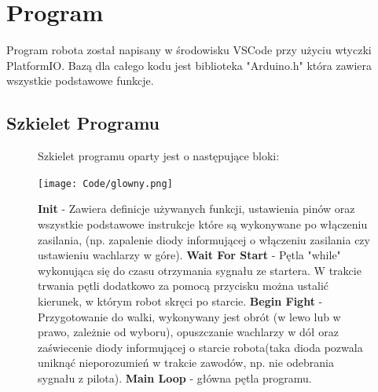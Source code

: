 \documentclass[polish,polish,a4paper]{article}
\begin{document}
    \newpage
    
\section{Program}
    Program robota został napisany w środowisku VSCode przy użyciu wtyczki PlatformIO. 
    Bazą dla całego kodu jest biblioteka "Arduino.h" która zawiera wszystkie podstawowe funkcje. 
    \subsection{Szkielet Programu}



    \begin{figure}[!htb]
       \begin{minipage}{0.3\textwidth}
         
         Szkielet programu oparty jest o następujące bloki:
    
    
        \centering
        \texttt{[image: Code/glowny.png]}
        
       \end{minipage} \hspace{5mm}
       \begin{minipage}{0.7\textwidth}
         
          \textbf{Init} - Zawiera definicje używanych funkcji, ustawienia pinów oraz wszystkie podstawowe instrukcje które są wykonywane po włączeniu zasilania, (np. zapalenie diody informującej o włączeniu zasilania czy ustawieniu wachlarzy w góre).
    \newline
    \textbf{Wait For Start} - Pętla "while" wykonująca się do czasu otrzymania sygnału ze startera. W trakcie trwania pętli dodatkowo za pomocą przycisku można ustalić kierunek, w którym robot skręci po starcie.
    \newline
    \textbf{Begin Fight} - Przygotowanie do walki, wykonywany jest obrót (w lewo lub w prawo, zależnie od wyboru), opuszczanie wachlarzy w dół oraz zaświecenie diody informującej o starcie robota(taka dioda pozwala uniknąć nieporozumień w trakcie zawodów, np. nie odebrania sygnału z pilota). 
    \newline
    \textbf{Main Loop} - główna pętla programu.
    
       \end{minipage}
        \end{figure}
\end{document}
